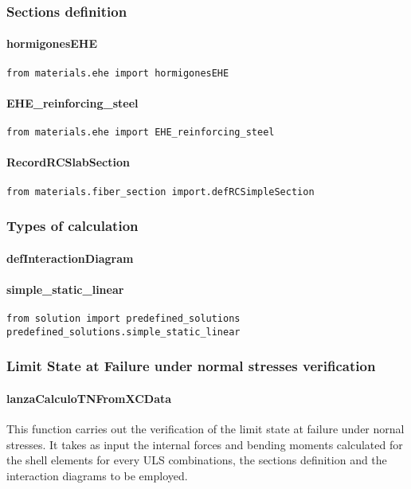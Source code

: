 \subsubsection{Sections definition}
\paragraph{hormigonesEHE}
\begin{verbatim}
from materials.ehe import hormigonesEHE
\end{verbatim}

\paragraph{EHE\_reinforcing\_steel}
\begin{verbatim}
from materials.ehe import EHE_reinforcing_steel
\end{verbatim}

\paragraph{RecordRCSlabSection}
\begin{verbatim}
from materials.fiber_section import.defRCSimpleSection
\end{verbatim}


\subsubsection{Types of calculation}
\paragraph{defInteractionDiagram}

\paragraph{simple\_static\_linear}
\begin{verbatim}
from solution import predefined_solutions
predefined_solutions.simple_static_linear
\end{verbatim}

\subsubsection{Limit State at Failure under normal stresses verification}

\paragraph{lanzaCalculoTNFromXCData}
This function carries out the verification of the limit state at failure under nornal stresses. It takes as input the internal forces and bending moments calculated for the shell elements for every ULS combinations, the sections definition and the interaction diagrams to be employed.

